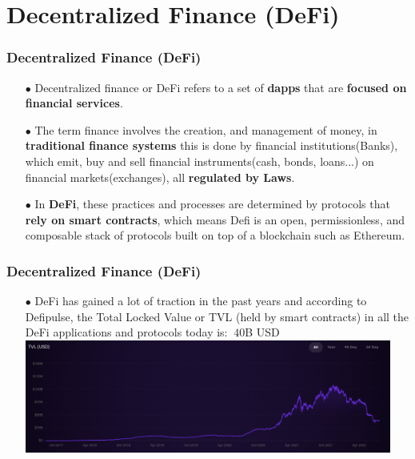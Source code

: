\documentclass{beamer}
\begin{document}
\section{Decentralized Finance (DeFi)}

\begin{frame}	
\frametitle{Decentralized Finance (DeFi) }
	\begin{itemize}

		\item[$\bullet$] Decentralized finance or DeFi refers to a set of \textbf{dapps} that are \textbf{focused on financial services}. 
		\item[$\bullet$] The term finance involves the creation, and management of money, in \textbf{traditional finance systems} this is done by financial institutions(Banks), which emit, buy and sell financial instruments(cash, bonds, loans...) on financial markets(exchanges), all \textbf{regulated by Laws}. 
		\item[$\bullet$] In \textbf{DeFi}, these practices and processes are determined by protocols that \textbf{rely on smart contracts}, which means Defi is an open, permissionless, and composable stack of protocols built on top of a blockchain such as Ethereum.
	\end{itemize}
\end{frame}

\begin{frame}	
	\frametitle{Decentralized Finance (DeFi) }
	\begin{itemize}
		\item[$\bullet$]  DeFi has gained a lot of traction in the past years
		and according to Defipulse, the Total Locked Value or TVL (held by smart contracts) in all the DeFi applications and protocols today is: $~40$B USD \\
		\includegraphics[width=0.95\textwidth, center]{tvl}
	\end{itemize}
\end{frame}
\end{document}
